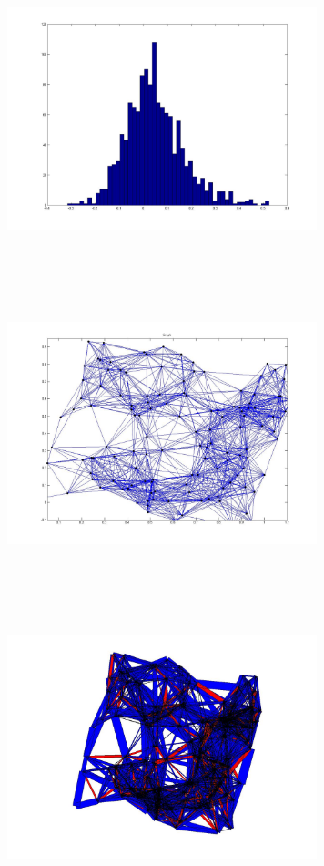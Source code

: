 \includegraphics[width=9.0cm,height=9.0cm]{images/GraphTheory/RandomGraphOptimalEdgeInputGraph_EdgeWeightHist_FMMC.jpg}
\includegraphics[width=9.0cm,height=9.0cm]{images/GraphTheory/RandomGraphOptimalEdgeInputGraph_IncidenceMatrix.jpg}
\includegraphics[width=9.0cm,height=9.0cm]{images/GraphTheory/RandomGraphOptimalEdgeWithedgeWeight_FastMixingMarkovChain.jpg}
